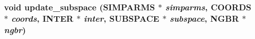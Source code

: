 \subsubsection{\setlength{\rightskip}{0pt plus 5cm}void update\_\-subspace ({\bf SIMPARMS} $\ast$ {\em simparms}, {\bf COORDS} $\ast$ {\em coords}, {\bf INTER} $\ast$ {\em inter}, {\bf SUBSPACE} $\ast$ {\em subspace}, {\bf NGBR} $\ast$ {\em ngbr})}\label{md__substep_8c_9468568a7bc5fdf6d782042505ba6732}


